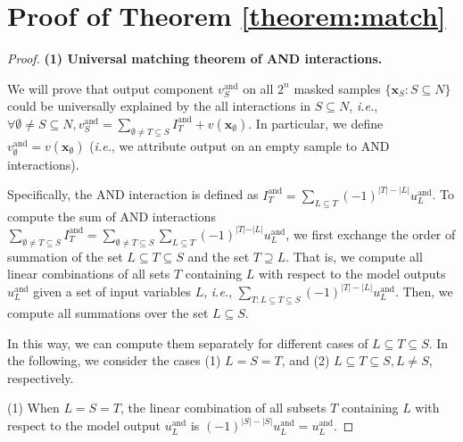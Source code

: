 \documentclass[10pt,twocolumn,letterpaper]{article}
\begin{document}

\section{Proof of Theorem \ref{theorem:match}}
\label{proof:match}

\begin{proof} \textbf{(1) Universal matching theorem of AND interactions.}

We will prove that output component \( v^{\text{and}}_S \) on all \( 2^n \) masked samples \( \{\mathbf{x}_S:S\subseteq N\} \) could be universally explained by the all interactions in \( S\subseteq N \), \emph{i.e.}, \( \forall \emptyset \neq S\subseteq N, v^{\text{and}}_S = \sum_{\emptyset \neq T\subseteq S} I^{\text{and}}_T + v(\mathbf{x}_\emptyset) \). In particular, we define \( v^{\text{and}}_\emptyset = v(\mathbf{x}_\emptyset) \) (\textit{i.e.}, we attribute output on an empty sample to AND interactions).

Specifically, the AND interaction is defined as \( I^{\text{and}}_T = \sum\nolimits_{L \subseteq T} (-1)^{|T|-|L|} u^{\text{and}}_L \).
To compute the sum of AND interactions \( \sum_{\emptyset \neq T\subseteq S} I^{\text{and}}_T = \sum\nolimits_{\emptyset \neq T \subseteq S} \sum\nolimits_{L \subseteq T} (-1)^{\vert T \vert - \vert L \vert} u^{\text{and}}_L \), we first exchange the order of summation of the set \( L\subseteq T\subseteq S \) and the set \( T \supseteq L \).
That is, we compute all linear combinations of all sets \( T \) containing \( L \) with respect to the model outputs \( u^{\text{and}}_L \) given a set of input variables \( L \), \textit{i.e.}, \( \sum\nolimits_{T: L \subseteq T \subseteq S} (-1)^{|T|-|L|} u^{\text{and}}_L \).
Then, we compute all summations over the set \( L\subseteq S \).

In this way, we can compute them separately for different cases of \( L\subseteq T\subseteq S \). In the following, we consider the cases (1) \( L = S = T \), and (2) \( L\subseteq T\subseteq S, L\ne S \), respectively.

(1) When \( L=S=T \), the linear combination of all subsets \( T \) containing \( L \) with respect to the model output \( u^{\text{and}}_L \) is \( (-1)^{|S|-|S|} u^{\text{and}}_L = u^{\text{and}}_L \).


\end{proof}
\end{document}
